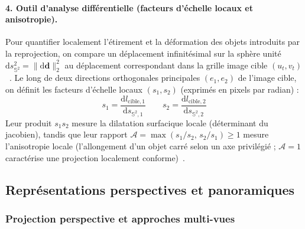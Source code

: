 \documentclass[11pt,a4paper]{article}
\renewcommand{\emph}[1]{\textup{#1}}
\begin{document}
\paragraph{4. Outil d'analyse différentielle (facteurs d'échelle locaux et anisotropie).}
Pour quantifier localement l'étirement et la déformation des objets introduits par la reprojection, on compare un déplacement infinitésimal sur la sphère unité $\mathrm{d}s_{\mathbb{S}^2}^2 = \|\mathrm{d}\mathbf{d}\|_2^2$ au déplacement correspondant dans la grille image cible $(u_t, v_t)$~\cite{docarmo1976,snyder1987}. Le long de deux directions orthogonales principales $(e_1, e_2)$ de l'image cible, on définit les \emph{facteurs d'échelle locaux} $(s_1, s_2)$ (exprimés en pixels par radian) :
\begin{equation}
  s_1 = \frac{\mathrm{d}l_{\text{cible}, 1}}{\mathrm{d}s_{\mathbb{S}^2, 1}} \qquad
  s_2 = \frac{\mathrm{d}l_{\text{cible}, 2}}{\mathrm{d}s_{\mathbb{S}^2, 2}}
\end{equation}
Leur produit $s_1 s_2$ mesure la dilatation surfacique locale (déterminant du jacobien), tandis que leur rapport $\mathcal{A} = \max(s_1/s_2, \, s_2/s_1) \ge 1$ mesure l'\emph{anisotropie locale} (l'allongement d'un objet carré selon un axe privilégié ; $\mathcal{A} = 1$ caractérise une projection localement conforme)~\cite{snyder1987}.

\subsection{Représentations perspectives et panoramiques}

\subsubsection{Projection perspective et approches multi-vues}
\end{document}
